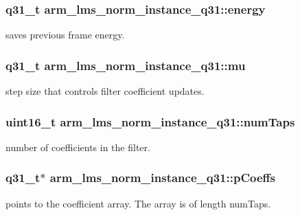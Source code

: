 \subsubsection[{\texorpdfstring{energy}{energy}}]{\setlength{\rightskip}{0pt plus 5cm}q31\+\_\+t arm\+\_\+lms\+\_\+norm\+\_\+instance\+\_\+q31\+::energy}\hypertarget{structarm__lms__norm__instance__q31_a3c0ae42869afec8555dc8e3a7ef9b386}{}\label{structarm__lms__norm__instance__q31_a3c0ae42869afec8555dc8e3a7ef9b386}
saves previous frame energy. 
\subsubsection[{\texorpdfstring{mu}{mu}}]{\setlength{\rightskip}{0pt plus 5cm}q31\+\_\+t arm\+\_\+lms\+\_\+norm\+\_\+instance\+\_\+q31\+::mu}\hypertarget{structarm__lms__norm__instance__q31_ad3dd2a2406e02fdaa7782ba6c3940a64}{}\label{structarm__lms__norm__instance__q31_ad3dd2a2406e02fdaa7782ba6c3940a64}
step size that controls filter coefficient updates. 
\subsubsection[{\texorpdfstring{num\+Taps}{numTaps}}]{\setlength{\rightskip}{0pt plus 5cm}uint16\+\_\+t arm\+\_\+lms\+\_\+norm\+\_\+instance\+\_\+q31\+::num\+Taps}\hypertarget{structarm__lms__norm__instance__q31_a28e4c085af69c9c3e2e95dacf8004c3e}{}\label{structarm__lms__norm__instance__q31_a28e4c085af69c9c3e2e95dacf8004c3e}
number of coefficients in the filter. 
\subsubsection[{\texorpdfstring{p\+Coeffs}{pCoeffs}}]{\setlength{\rightskip}{0pt plus 5cm}q31\+\_\+t$\ast$ arm\+\_\+lms\+\_\+norm\+\_\+instance\+\_\+q31\+::p\+Coeffs}\hypertarget{structarm__lms__norm__instance__q31_a57a64c1ff102d033c1bd05043f1d9955}{}\label{structarm__lms__norm__instance__q31_a57a64c1ff102d033c1bd05043f1d9955}
points to the coefficient array. The array is of length num\+Taps. 

